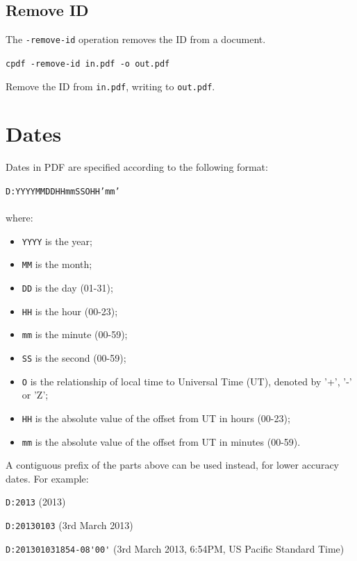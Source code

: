 \documentclass[a4paper,makeidx]{memoir}
\begin{document}
\section{Remove ID}
  The \texttt{-remove-id} operation removes the ID from a document.
  \begin{framed}
  \small\noindent\verb!cpdf -remove-id in.pdf -o out.pdf!

  \vspace{2.5mm}
  \noindent Remove the ID from \texttt{in.pdf}, writing to \texttt{out.pdf}.
  \end{framed}

\appendix
\chapter{Dates}
\label{dates}
Dates in PDF are specified according to the following format:

\begin{framed}
\texttt{D:YYYYMMDDHHmmSSOHH'mm'}\\\\where:

\begin{itemize}
  \item \texttt{YYYY} is the year;
  \item \texttt{MM} is the month;
  \item \texttt{DD} is the day (01-31);
  \item \texttt{HH} is the hour (00-23);
  \item \texttt{mm} is the minute (00-59);
  \item \texttt{SS} is the second (00-59);
  \item \texttt{O} is the relationship of local time to Universal Time (UT), denoted by '+', '-' or 'Z';
  \item \texttt{HH} is the absolute value of the offset from UT in hours (00-23);
  \item \texttt{mm} is the absolute value of the offset from UT in minutes (00-59).
\end{itemize}
\end{framed}

\noindent A contiguous prefix of the parts above can be used instead, for lower
accuracy dates. For example:

\begin{framed}
   \small\noindent\verb!D:2013! (2013)
   
   \vspace{1.5mm}
   \noindent\verb!D:20130103! (3rd March 2013)

   \vspace{1.5mm}
   \noindent\verb!D:201301031854-08'00'! (3rd March 2013, 6:54PM, US Pacific Standard Time)
   
\end{framed}
 
\backmatter
\printindex
\end{document}
